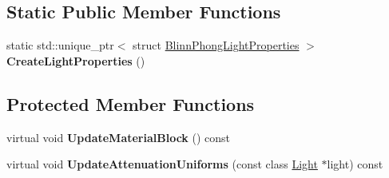 \subsection*{Static Public Member Functions}
\begin{DoxyCompactItemize}
\item 
\hypertarget{class_blinn_phong_shader_a44f9413ef4896886b67b12c8809e5cd9}{}static std\+::unique\+\_\+ptr$<$ struct \hyperlink{struct_blinn_phong_light_properties}{Blinn\+Phong\+Light\+Properties} $>$ {\bfseries Create\+Light\+Properties} ()\label{class_blinn_phong_shader_a44f9413ef4896886b67b12c8809e5cd9}

\end{DoxyCompactItemize}
\subsection*{Protected Member Functions}
\begin{DoxyCompactItemize}
\item 
\hypertarget{class_blinn_phong_shader_ab620e8e40408c63f465af866e5ca9ef7}{}virtual void {\bfseries Update\+Material\+Block} () const \label{class_blinn_phong_shader_ab620e8e40408c63f465af866e5ca9ef7}

\item 
\hypertarget{class_blinn_phong_shader_aca3ae20f36d92b4e9b64ca4ae51a49f2}{}virtual void {\bfseries Update\+Attenuation\+Uniforms} (const class \hyperlink{class_light}{Light} $\ast$light) const \label{class_blinn_phong_shader_aca3ae20f36d92b4e9b64ca4ae51a49f2}

\end{DoxyCompactItemize}
